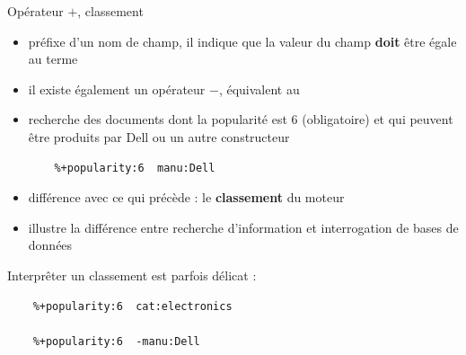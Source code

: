 \begin{frame}[fragile]{Opérateur $+$, classement}
  \begin{itemize}
    \item préfixe d'un nom de champ, il indique que la valeur du champ {\bf doit}
      être égale au terme
    \item il existe également un opérateur $-$, équivalent au 
    \item recherche des documents dont la popularité est 6 (obligatoire) et qui peuvent
être produits par Dell ou un autre constructeur 
\begin{verbatim}
    %+popularity:6  manu:Dell
\end{verbatim}
\item différence avec ce qui précède : le {\bf classement} du moteur
\item illustre la différence entre recherche d'information et interrogation
  de bases de données
  \end{itemize}
  \bigskip
  Interprêter un classement est parfois délicat :\\
\begin{verbatim}
    %+popularity:6  cat:electronics

    %+popularity:6  -manu:Dell

\end{verbatim}
\end{frame}
